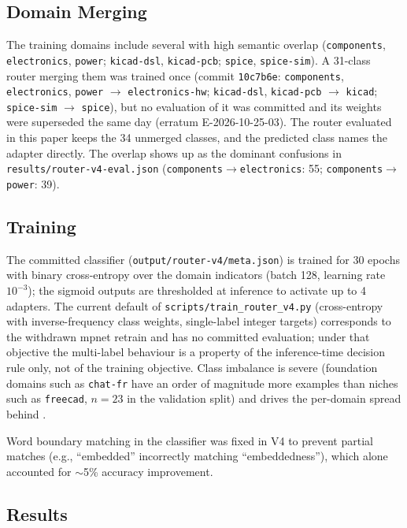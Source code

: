 \documentclass[11pt,a4paper]{article}
\begin{document}
\subsection{Domain Merging}

The training domains include several with high semantic overlap (\texttt{components}, \texttt{electronics}, \texttt{power}; \texttt{kicad-dsl}, \texttt{kicad-pcb}; \texttt{spice}, \texttt{spice-sim}). A 31-class router merging them was trained once (commit \texttt{10c7b6e}: \texttt{components}, \texttt{electronics}, \texttt{power} $\rightarrow$ \texttt{electronics-hw}; \texttt{kicad-dsl}, \texttt{kicad-pcb} $\rightarrow$ \texttt{kicad}; \texttt{spice-sim} $\rightarrow$ \texttt{spice}), but no evaluation of it was committed and its weights were superseded the same day (erratum E-2026-10-25-03). The router evaluated in this paper keeps the 34 unmerged classes, and the predicted class names the adapter directly. The overlap shows up as the dominant confusions in \texttt{results/router-v4-eval.json} (\texttt{components}$\rightarrow$\texttt{electronics}: 55; \texttt{components}$\rightarrow$\texttt{power}: 39).

\subsection{Training}

The committed classifier (\texttt{output/router-v4/meta.json}) is trained for 30 epochs with binary cross-entropy over the domain indicators (batch 128, learning rate $10^{-3}$); the sigmoid outputs are thresholded at inference to activate up to 4 adapters. The current default of \texttt{scripts/train\_router\_v4.py} (cross-entropy with inverse-frequency class weights, single-label integer targets) corresponds to the withdrawn mpnet retrain and has no committed evaluation; under that objective the multi-label behaviour is a property of the inference-time decision rule only, not of the training objective. Class imbalance is severe (foundation domains such as \texttt{chat-fr} have an order of magnitude more examples than niches such as \texttt{freecad}, $n = 23$ in the validation split) and drives the per-domain spread behind .

Word boundary matching in the classifier was fixed in V4 to prevent partial matches (e.g., ``embedded'' incorrectly matching ``embeddedness''), which alone accounted for $\sim$5\% accuracy improvement.

\subsection{Results}
\end{document}
